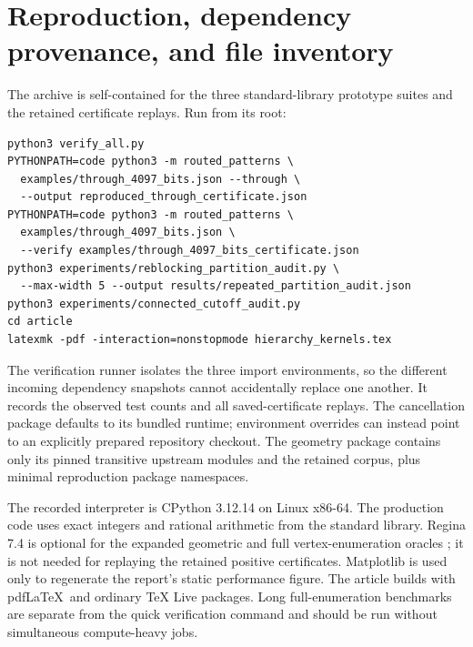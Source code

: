 \section{Reproduction, dependency provenance, and file inventory}

The archive is self-contained for the three standard-library prototype suites
and the retained certificate replays. Run from its root:
\begin{verbatim}
python3 verify_all.py
PYTHONPATH=code python3 -m routed_patterns \
  examples/through_4097_bits.json --through \
  --output reproduced_through_certificate.json
PYTHONPATH=code python3 -m routed_patterns \
  examples/through_4097_bits.json \
  --verify examples/through_4097_bits_certificate.json
python3 experiments/reblocking_partition_audit.py \
  --max-width 5 --output results/repeated_partition_audit.json
python3 experiments/connected_cutoff_audit.py
cd article
latexmk -pdf -interaction=nonstopmode hierarchy_kernels.tex
\end{verbatim}

The verification runner isolates the three import environments, so the
different incoming dependency snapshots cannot accidentally replace one
another. It records the observed test counts and all saved-certificate
replays. The cancellation package defaults to its bundled runtime; environment
overrides can instead point to an explicitly prepared repository checkout.
The geometry package contains only its pinned transitive upstream modules and
the retained corpus, plus minimal reproduction package namespaces.

The recorded interpreter is CPython 3.12.14 on Linux x86-64. The production
code uses exact integers and rational arithmetic from the standard library.
Regina 7.4 is optional for the expanded geometric and full vertex-enumeration
oracles \cite{regina}; it is not needed for replaying the retained positive
certificates. Matplotlib is used only to regenerate the report's static
performance figure. The article builds with pdf\LaTeX\ and ordinary TeX Live
packages. Long full-enumeration benchmarks are separate from the quick
verification command and should be run without simultaneous compute-heavy
jobs.

